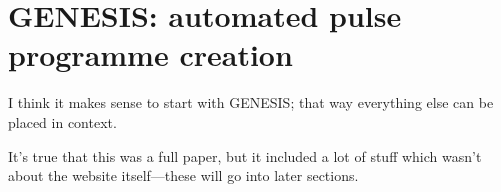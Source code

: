 \section{GENESIS: automated pulse programme creation}
\label{sec:noah__genesis}

I think it makes sense to start with GENESIS\autocite{Yong2022AC}; that way everything else can be placed in context.

It's true that this was a full paper, but it included a lot of stuff which wasn't about the website itself---these will go into later sections.
